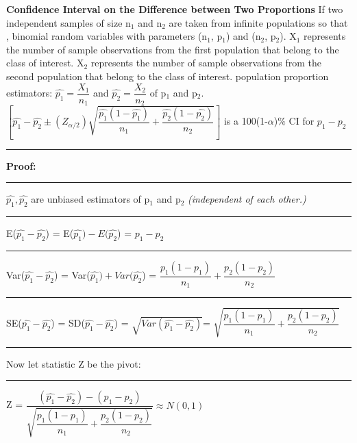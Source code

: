 \documentclass[]{article}
\begin{document}
\newline
\Large\textbf{Confidence Interval on the Difference between Two Proportions}
\newline If two independent samples of size n$_1$ and  n$_2$ are taken from infinite populations so that , binomial random variables with parameters (n$_1$, p$_1$) and (n$_2$, p$_2$).
\newline X$_1$ represents the number of sample observations from the first population that belong to the class of interest.
\newline X$_2$ represents the number of sample observations from the second population that belong to the class of interest.
\newline population proportion estimators: $\hat{p_1} =  \dfrac{X_1}{n_1}$  and $\hat{p_2} =  \dfrac{X_2}{n_2}$ of  p$_1$ and p$_2$.
\newline
\newline 
\newline
$\left[ \hat{p_{1}} - \hat{p_{2}} \pm \left( Z_{\alpha / 2 }  \right) \sqrt{\dfrac{ \hat{p_1} (1 -\hat{p_1}) }{n_1} + \dfrac{ \hat{p_2} (1 -\hat{p_2}) }{n_2}}  \right] $ is a 100(1-$\alpha$)$\%$ CI for $p_1 - p_2$ 
\newline 
\newline
\newline\Large\rule{3.0cm}{0pt} \textbf{Proof:}
\newline\Large\rule{3.0cm}{0pt} $\hat{p_{1}}, \hat{p_{2}} $ are unbiased estimators of  p$_1$ and p$_2$\textit{ (independent of each other.)}
\newline 
\newline\Large\rule{3.0cm}{0pt} E($\hat{p_1} - \hat{p_2}$) = E($\hat{p_1}) -E( \hat{p_2}$) = $p_1 - p_2$
\newline
\newline\Large\rule{3.0cm}{0pt} Var($\hat{p_1} - \hat{p_2}$) = Var($\hat{p_1}) + Var( \hat{p_2}$) = $\dfrac{p_1 (1 - p_1)}{n_1} + \dfrac{p_2 (1 - p_2)}{n_2}$
\newline
\newline\Large\rule{3.0cm}{0pt} SE($\hat{p_1} - \hat{p_2}$) = SD($\hat{p_1} - \hat{p_2}$) = $\sqrt{Var(\hat{p_1} - \hat{p_2})  }$= $\sqrt{\dfrac{p_1 (1 - p_1)}{n_1} + \dfrac{p_2 (1 - p_2)}{n_2}}$
\newline\newline\Large\rule{3.0cm}{0pt} Now let statistic Z be the  pivot:
\newline
\newline\Large\rule{3.0cm}{0pt} Z = $\dfrac{(\hat{p_1} - \hat{p_2}) - (p_1 - p_2) }{\sqrt{\dfrac{p_1 (1 - p_1)}{n_1} + \dfrac{p_2 (1 - p_2)}{n_2}}} \approx N(0,1)$
\end{document}
